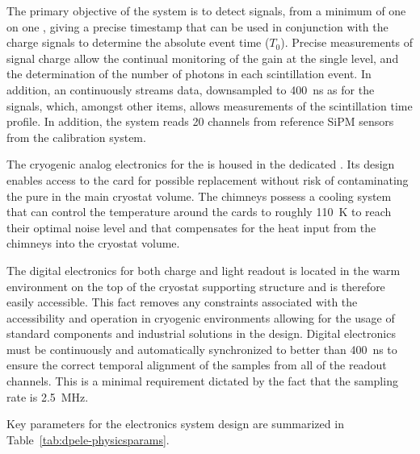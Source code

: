 The primary objective of the  system is to detect signals, from a minimum of one \phel on one , giving a precise timestamp that can be used in conjunction with the charge signals to determine the absolute event time ($T_0$). 
Precise measurements of  signal charge allow the continual monitoring of the  gain at the single \phel level, and the determination of the number of photons in each scintillation event.  In addition, an   continuously streams data, downsampled to \SI{400}{ns} as for the  signals,  which, amongst other items, allows measurements of the scintillation time profile. In addition, the  system reads \num{20} channels from reference SiPM sensors from the  calibration system.

The cryogenic analog electronics for the  is housed in the dedicated . %
Its design %
enables access to the  card for possible replacement without %
risk of contaminating the pure \lar in the main cryostat volume. The chimneys %
possess a cooling system that can control the temperature around the  cards to roughly \SI{110}{\kelvin} %
to reach their optimal noise level and %
that compensates for the heat input from the chimneys into the cryostat volume. 

The digital electronics for both charge and light readout is located in the warm environment on the top of the cryostat supporting structure and is therefore easily accessible. This fact removes any constraints associated with the accessibility and operation in cryogenic environments allowing for the usage of standard components and industrial solutions in the design. Digital electronics must be continuously and automatically synchronized to better than \SI{400}{\nano\s} to ensure the correct temporal alignment of the  samples from all of the readout channels. This is a minimal requirement dictated by the fact that the sampling rate is \SI{2.5}{\MHz}.  

Key parameters for the electronics system design are summarized in Table~\ref{tab:dpele-physicsparams}. %

